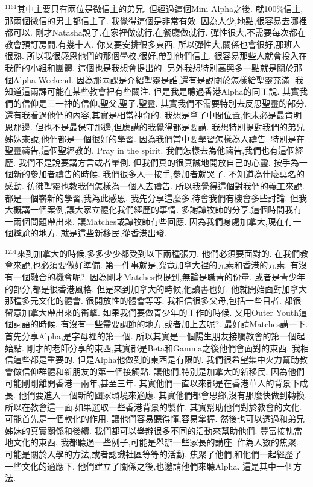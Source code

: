 \documentclass{book}
\begin{document}
$^{1161}$其中主要只有兩位是微信主的弟兄.
但經過這個Mini-Alpha之後.
就100\%信主,那兩個微信的男士都信主了.
我覺得這個是非常有效.
因為人少,地點,很容易去哪裡都可以.
剛才Natasha說了,在家裡做就行,在餐廳做就行.
彈性很大,不需要每次都在教會預訂房間,有幾十人.
你又要安排很多東西.
所以彈性大,關係也會很好,那班人很熟.
所以我很感恩他們的那個學校,很好,帶到他們信主.
很容易那些人就會投入在我們的小組和團體.
這個也是我想會提出的.
另外我想特別高興多一點就是關於那個Alpha Weekend.
因為那兩課是介紹聖靈是誰,還有是說關於怎樣給聖靈充滿.
我知道這兩課可能在某些教會裡有些關注.
但是我是聽過香港Alpha的同工說.
其實我們的信仰是三一神的信仰,聖父,聖子,聖靈.
其實我們不需要特別去反思聖靈的部分.
還有我看過他們的內容,其實是相當神奇的.
我想是拿了中間位置,他未必是最肯明恩那邊.
但也不是最保守那邊,但應講的我覺得都是要講.
我想特別提對我們的弟兄姊妹來說,他們都是一個很好的學習.
因為我們當中要學習怎樣為人禱告.
特別是在聖靈禱告,這個聖經教的.
Pray in the spirit.
我們怎樣去為他禱告,我們也有這個經歷.
我們不是說要講方言或者暈倒.
但我們真的很真誠地開放自己的心靈.
按手為一個新的參加者禱告的時候.
我們很多人一按手,參加者就哭了.
不知道為什麼莫名的感動.
彷彿聖靈也教我們怎樣為一個人去禱告.
所以我覺得這個對我們的義工來說.
都是一個嶄新的學習,我為此感恩.
我先分享這麼多,待會我們有機會多些討論.
但我大概講一個案例,讓大家立體化我們經歷的事情.
多謝譚牧師的分享,這個時間我有一兩個問題帶出來.
讓Matches或譚牧師有些回應.
因為我們身處加拿大,現在有一個尷尬的地方.
就是這些新移民,從香港出發.

$^{1201}$來到加拿大的時候,多多少少都受到以下兩種張力.
他們必須要面對的.
在我們教會來說,也必須要做好準備.
第一件事就是,究竟加拿大裡的元素和香港的元素.
有沒有一個融合的機會呢?.
因為剛才Matches也提到,無論是職青的份量.
或者是青少年的部分,都是很香港風格.
但是來到加拿大的時候,他讀書也好.
他就開始面對加拿大那種多元文化的體會.
很開放性的體會等等.
我相信很多父母,包括一些目者.
都很留意加拿大帶出來的衝擊.
如果我們要做青少年的工作的時候.
又用Outer Youth這個詞語的時候.
有沒有一些需要調節的地方,或者加上去呢?.
最好請Matches講一下.
首先分享Alpha,是字母裡的第一個.
所以其實是一個陽生朋友接觸教會的第一個起始點.
剛才的老師分享的東西,其實都是Beta和Gamma之後他們會面對的東西.
我相信這些都是重要的.
但是Alpha他做到的東西是有限的.
我們很希望集中火力幫助教會做信仰群體和新朋友的第一個接觸點.
讓他們,特別是加拿大的新移民.
因為他們可能剛剛離開香港一兩年,甚至三年.
其實他們一直以來都是在香港華人的背景下成長.
他們要進入一個新的國家環境來適應.
其實他們都會思鄉,沒有那麼快做到轉換.
所以在教會這一面,如果選取一些香港背景的製作.
其實幫助他們對於教會的文化.
可能首先是一個軟化的作用.
讓他們容易聽得懂,容易掌握.
然後也可以透過和弟兄姊妹的真實關係和後續.
我們都可以舉辦很多不同的活動來幫助他們.
豐富接軌當地文化的東西.
我都聽過一些例子,可能是舉辦一些家長的講座.
作為人數的焦聚.
可能是關於入學的方法,或者認識社區等等的活動.
焦聚了他們,和他們一起經歷了一些文化的適應下.
他們建立了關係之後,也邀請他們來聽Alpha.
這是其中一個方法.
\end{document}
